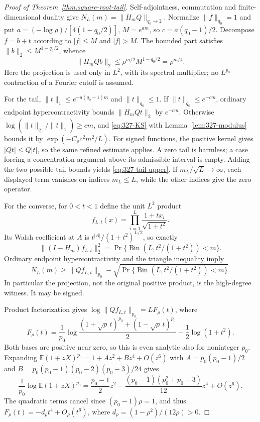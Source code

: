 \documentclass[11pt]{article}
\begin{document}
\begin{proof}[Proof of Theorem~\ref{thm:square-root-tail}]
Self-adjointness, commutation and finite-dimensional duality give
$N_L(m)=\|H_mQ\|_{q_0\to2}$. Normalize $\|f\|_{q_0}=1$ and put
$a=(-\log\rho)/[4(1-q_0/2)]$, $M=e^{am}$, so $c=a(q_0-1)/2$.
Decompose $f=b+t$ according to $|f|\leq M$ and $|f|>M$.
The bounded part satisfies $\|b\|_2\leq M^{1-q_0/2}$, whence
\[
 \|H_mQb\|_2\leq\rho^{m/2}M^{1-q_0/2}=\rho^{m/4}.
\]
Here the projection is used only in $L^2$, with its spectral multiplier;
no $L^{p_0}$ contraction of a Fourier cutoff is assumed.

For the tail, $\|t\|_1\leq e^{-a(q_0-1)m}$ and $\|t\|_{q_0}\leq1$.
If $\|t\|_{q_0}\leq e^{-cm}$, ordinary endpoint hypercontractivity
bounds $\|H_mQt\|_2$ by $e^{-cm}$. Otherwise
$\log(\|t\|_{q_0}/\|t\|_1)\geq cm$, and
\eqref{eq:327-KS} with Lemma~\ref{lem:327-modulus} bounds it by
$\exp(-C_\rho c^2m^2/L)$.
For signed functions, the positive kernel gives
$|Qt|\leq Q|t|$, so the same refined estimate applies. A zero tail is
harmless; a case forcing a concentration argument above its admissible
interval is empty. Adding the two possible tail bounds yields
\eqref{eq:327-tail-upper}. If $m_L/\sqrt L\to\infty$, each displayed
term vanishes on indices $m_L\leq L$, while the other indices give
the zero operator.

For the converse, for $0<t<1$ define the unit $L^2$ product
\[
 f_{L,t}(x)=\prod_{i=1}^L\frac{1+tx_i}{\sqrt{1+t^2}}.
\]
Its Walsh coefficient at $A$ is $t^{|A|}/(1+t^2)^{L/2}$, so exactly
\[
 \|(I-H_m)f_{L,t}\|_2^2
 =\Pr\{\operatorname{Bin}(L,t^2/(1+t^2))<m\}.
\]
Ordinary endpoint hypercontractivity and the triangle inequality imply
\begin{equation}\label{eq:327-witness}
 N_L(m)\geq\|Qf_{L,t}\|_{p_0}
 -\sqrt{\Pr\{\operatorname{Bin}(L,t^2/(1+t^2))<m\}}.
\end{equation}
In particular the projection, not the original positive product, is the
high-degree witness. It may be signed.

Product factorization gives $\log\|Qf_{L,t}\|_{p_0}=LF_\rho(t)$, where
\[
 F_\rho(t)=\frac1{p_0}\log\frac{(1+\sqrt\rho\,t)^{p_0}
                                  +(1-\sqrt\rho\,t)^{p_0}}2
                  -\frac12\log(1+t^2).
\]
Both bases are positive near zero, so this is even analytic also for
noninteger $p_0$. Expanding
$\mathbb E(1+zX)^{p_0}=1+A z^2+Bz^4+O(z^6)$ with
$A=p_0(p_0-1)/2$ and $B=p_0(p_0-1)(p_0-2)(p_0-3)/24$ gives
\[
 \frac1{p_0}\log\mathbb E(1+zX)^{p_0}
 =\frac{p_0-1}{2}z^2
 -\frac{(p_0-1)(p_0^2+p_0-3)}{12}z^4+O(z^6).
\]
The quadratic terms cancel since $(p_0-1)\rho=1$, and thus
$F_\rho(t)=-d_\rho t^4+O_\rho(t^6)$, where
$d_\rho=(1-\rho^2)/(12\rho)>0$.


\end{proof}
\end{document}
